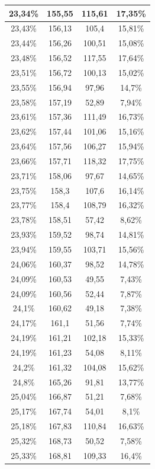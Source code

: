 \begin{center}
\begin{longtable}{|c|c|c|c|}
23,34\% & 155,55 & 115,61 & 17,35\%  \\ \hline
23,43\% & 156,13 & 105,4 & 15,81\%  \\ \hline
23,44\% & 156,26 & 100,51 & 15,08\%  \\ \hline
23,48\% & 156,52 & 117,55 & 17,64\%  \\ \hline
23,51\% & 156,72 & 100,13 & 15,02\%  \\ \hline
23,55\% & 156,94 & 97,96 & 14,7\%  \\ \hline
23,58\% & 157,19 & 52,89 & 7,94\%  \\ \hline
23,61\% & 157,36 & 111,49 & 16,73\%  \\ \hline
23,62\% & 157,44 & 101,06 & 15,16\%  \\ \hline
23,64\% & 157,56 & 106,27 & 15,94\%  \\ \hline
23,66\% & 157,71 & 118,32 & 17,75\%  \\ \hline
23,71\% & 158,06 & 97,67 & 14,65\%  \\ \hline
23,75\% & 158,3 & 107,6 & 16,14\%  \\ \hline
23,77\% & 158,4 & 108,79 & 16,32\%  \\ \hline
23,78\% & 158,51 & 57,42 & 8,62\%  \\ \hline
23,93\% & 159,52 & 98,74 & 14,81\%  \\ \hline
23,94\% & 159,55 & 103,71 & 15,56\%  \\ \hline
24,06\% & 160,37 & 98,52 & 14,78\%  \\ \hline
24,09\% & 160,53 & 49,55 & 7,43\%  \\ \hline
24,09\% & 160,56 & 52,44 & 7,87\%  \\ \hline
24,1\% & 160,62 & 49,18 & 7,38\%  \\ \hline
24,17\% & 161,1 & 51,56 & 7,74\%  \\ \hline
24,19\% & 161,21 & 102,18 & 15,33\%  \\ \hline
24,19\% & 161,23 & 54,08 & 8,11\%  \\ \hline
24,2\% & 161,32 & 104,08 & 15,62\%  \\ \hline
24,8\% & 165,26 & 91,81 & 13,77\%  \\ \hline
25,04\% & 166,87 & 51,21 & 7,68\%  \\ \hline
25,17\% & 167,74 & 54,01 & 8,1\%  \\ \hline
25,18\% & 167,83 & 110,84 & 16,63\%  \\ \hline
25,32\% & 168,73 & 50,52 & 7,58\%  \\ \hline
25,33\% & 168,81 & 109,33 & 16,4\%  \\ \hline

\end{longtable}
\end{center}
